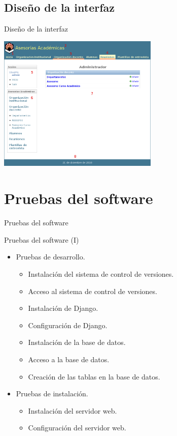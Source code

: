 \documentclass[10pt, hyperref={pdfpagelabels=false}]{beamer}
\begin{document}
    \subsection{Diseño de la interfaz}
      \begin{frame}{Diseño de la interfaz}
        \begin{center}
          \includegraphics[height=6.5cm]{Diagramas/gestion_informacion.png}
        \end{center}
      \end{frame}


  \section{Pruebas del software}
    \begin{frame}{Pruebas del software}
      \begin{block}{Pruebas del software (I)}
          \begin{itemize}
          \item Pruebas de desarrollo.
          \begin{itemize}
            \item Instalación del sistema de control de versiones.
            \item Acceso al sistema de control de versiones.
            \item Instalación de Django.
            \item Configuración de Django.
            \item Instalación de la base de datos.
            \item Acceso a la base de datos.
            \item Creación de las tablas en la base de datos.
          \end{itemize}
          \item Pruebas de instalación.
          \begin{itemize}
            \item Instalación del servidor web.
            \item Configuración del servidor web.
          \end{itemize}
          \end{itemize}
      \end{block}
    \end{frame}
\end{document}
